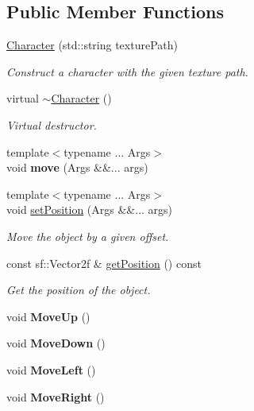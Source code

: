 \subsection*{Public Member Functions}
\begin{DoxyCompactItemize}
\item 
\mbox{\hyperlink{class_character_a9c0bcc7f37b218c920d014bf722037fa}{Character}} (std\+::string texture\+Path)
\begin{DoxyCompactList}\small\item\em Construct a character with the given texture path. \end{DoxyCompactList}\item 
\mbox{\label{class_character_a9e9be564d05ded80962b2045aa70b3fc}} 
virtual \mbox{\hyperlink{class_character_a9e9be564d05ded80962b2045aa70b3fc}{$\sim$\+Character}} ()
\begin{DoxyCompactList}\small\item\em Virtual destructor. \end{DoxyCompactList}\item 
\mbox{\label{class_character_a6e2226e97067453d9d4b131a8e0f9533}} 
{\footnotesize template$<$typename ... Args$>$ }\\void {\bfseries move} (Args \&\&... args)
\item 
{\footnotesize template$<$typename ... Args$>$ }\\void \mbox{\hyperlink{class_character_aeeced2dfcc027de98e223b4561760fa5}{set\+Position}} (Args \&\&... args)
\begin{DoxyCompactList}\small\item\em Move the object by a given offset. \end{DoxyCompactList}\item 
const sf\+::\+Vector2f \& \mbox{\hyperlink{class_character_aa07e2cfa12d28c14a1843455df396ee6}{get\+Position}} () const
\begin{DoxyCompactList}\small\item\em Get the position of the object. \end{DoxyCompactList}\item 
\mbox{\label{class_character_a4db2e97c66748b8a9180afff183503cd}} 
void {\bfseries Move\+Up} ()
\item 
\mbox{\label{class_character_ae95e334343aec128bae8598dc112b73c}} 
void {\bfseries Move\+Down} ()
\item 
\mbox{\label{class_character_aa977f6130dc475de481d39c543837187}} 
void {\bfseries Move\+Left} ()
\item 
\mbox{\label{class_character_a3ee06ab569d2bacb5f5663de0f80cbd3}} 
void {\bfseries Move\+Right} ()
\end{DoxyCompactItemize}

